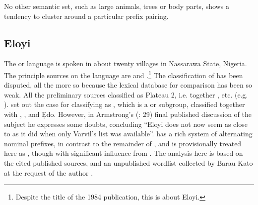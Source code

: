 \documentclass[output=paper]{langsci/langscibook}
\begin{document}
 \largerpage
No other semantic set, such as large animals, trees or body parts, shows a tendency to cluster around a particular prefix pairing.

\subsection{Eloyi} %

The  or  language is spoken in about twenty villages in Nassarawa State, Nigeria. The principle sources on the language are \citet{Mackay1964} and \citet{Armstrong1964,Armstrong1983,Armstrong1984}.\footnote{Despite the title of the 1984 publication, this is about Eloyi.} The classification of  has been disputed, all the more so because the lexical database for comparison has been so weak. All the preliminary sources classified  as Plateau 2, i.e. together ,  etc. (e.g. \citealt{Greenberg1963,WilliamsonShimizu1968,deWolf1971}). \citet{Armstrong1983} set out the case for classifying  as , which is a  or  subgroup, classified together with , ,  and Ẹdo. However, in Armstrong’s (\citeyear{Armstrong1984}: 29) final published discussion of the subject he expresses some doubts, concluding “Eloyi does not now seem as close to  as it did when only Varvil’s list was available”.  has a rich system of alternating nominal prefixes, in contrast to the remainder of , and is provisionally treated here as , though with significant influence from . The analysis here is based on the cited published sources, and an unpublished wordlist collected by Barau Kato at the request of the author \citet{Blenchn.d.i}.
\end{document}

